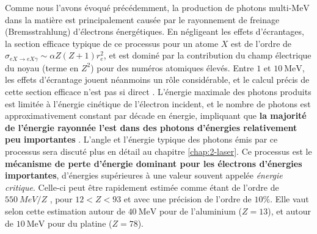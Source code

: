 \begin{refsection}
Comme nous l'avons évoqué précédemment, la production de photons multi-$\si{\MeV}$ dans la matière est principalement causée par le rayonnement de freinage (Bremsstrahlung) d'électrons énergétiques. En négligeant les effets d'écrantages, la section efficace typique de ce processus pour un atome $X$ est de l'ordre de \parencite{carron_2007} $\sigma_{e X \to e X \gamma} \sim \alpha Z(Z+1) r_e^2$, et est dominé par la contribution du champ électrique du noyau (terme en $Z^2$) pour des numéros atomiques élevés. Entre $1$ et $10 ~ \si{\MeV}$, les effets d'écrantage jouent néanmoins un rôle considérable, et le calcul précis de cette section efficace n'est pas si direct \parencite{mangiarotti_2017a}. L'énergie maximale des photons produits est limitée à l'énergie cinétique de l'électron incident, et le nombre de photons est approximativement constant par décade en énergie, impliquant que \textbf{la majorité de l'énergie rayonnée l'est dans des photons d'énergies relativement peu importantes} \parencite{carron_2007}. L'angle et l'énergie typique des photons émis par ce processus sera discuté plus en détail au chapitre \ref{chap:2-laser}. Ce processus est le \textbf{mécanisme de perte d'énergie dominant pour les électrons d'énergies importantes}, d'énergies supérieures à une valeur souvent appelée \textit{énergie critique}. Celle-ci peut être rapidement estimée comme étant de l'ordre de $550 ~ \si{MeV}/Z$ \parencite{deangelis_2018}, pour $12<Z<93$ et avec une précision de l'ordre de $10 \%$. Elle vaut selon cette estimation autour de $40 ~ \si{\MeV}$ pour de l'aluminium ($Z=13$), et autour de $10 ~ \si{\MeV}$ pour du platine ($Z=78$).




\end{refsection}
